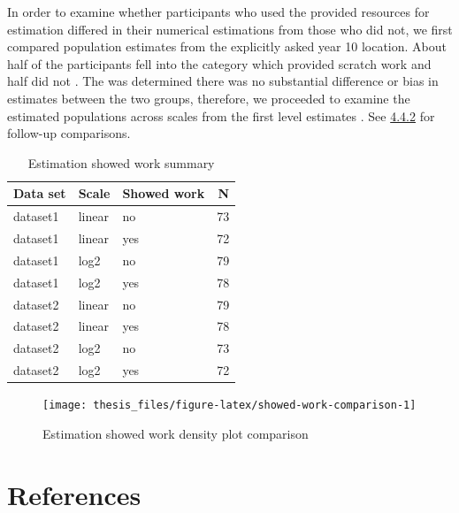 \documentclass[print]{nuthesis}
\begin{document}
In order to examine whether participants who used the provided resources for estimation differed in their numerical estimations from those who did not, we first compared population estimates from the explicitly asked year 10 location.
About half of the participants fell into the category which provided scratch work and half did not .
The was determined there was no substantial difference or bias in estimates between the two groups, therefore, we proceeded to examine the estimated populations across scales from the first level estimates .
See \protect\hyperlink{eq1-results}{4.4.2} for follow-up comparisons.

\begin{table}

\caption{\label{tab:showed-work-comparison-table}Estimation showed work summary}
\centering
\begin{tabular}[t]{lllr}
\toprule
Data set & Scale & Showed work & N\\
\midrule
dataset1 & linear & no & 73\\
dataset1 & linear & yes & 72\\
dataset1 & log2 & no & 79\\
dataset1 & log2 & yes & 78\\
dataset2 & linear & no & 79\\
\addlinespace
dataset2 & linear & yes & 78\\
dataset2 & log2 & no & 73\\
dataset2 & log2 & yes & 72\\
\bottomrule
\end{tabular}
\end{table}

\begin{figure}[tbp]

{\centering \texttt{[image: thesis\_files/figure-latex/showed-work-comparison-1]} 

}

\caption{Estimation showed work density plot comparison}\label{fig:showed-work-comparison}
\end{figure}

\backmatter

\hypertarget{references}{%
\chapter*{References}\label{references}}
\end{document}
